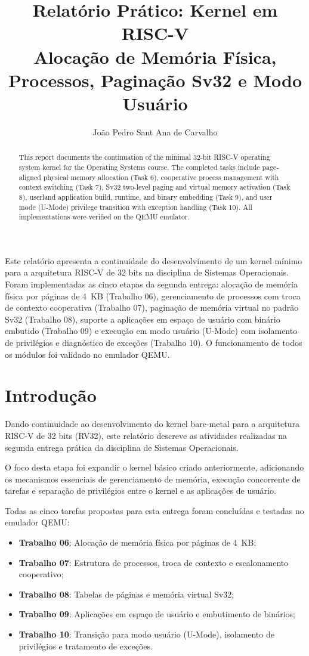 \documentclass[12pt]{article}
\title{Relatório Prático: Kernel em RISC-V\\
\large Alocação de Memória Física, Processos, Paginação Sv32 e Modo Usuário}
\author{João Pedro Sant Ana de Carvalho}
\begin{document}
\maketitle

\begin{abstract}
This report documents the continuation of the minimal 32-bit RISC-V operating system kernel for the Operating Systems course. The completed tasks include page-aligned physical memory allocation (Task 6), cooperative process management with context switching (Task 7), Sv32 two-level paging and virtual memory activation (Task 8), userland application build, runtime, and binary embedding (Task 9), and user mode (U-Mode) privilege transition with exception handling (Task 10). All implementations were verified on the QEMU emulator.
\end{abstract}

\begin{resumo}
Este relatório apresenta a continuidade do desenvolvimento de um kernel mínimo para a arquitetura RISC-V de 32 bits na disciplina de Sistemas Operacionais. Foram implementadas as cinco etapas da segunda entrega: alocação de memória física por páginas de 4~KB (Trabalho 06), gerenciamento de processos com troca de contexto cooperativa (Trabalho 07), paginação de memória virtual no padrão Sv32 (Trabalho 08), suporte a aplicações em espaço de usuário com binário embutido (Trabalho 09) e execução em modo usuário (U-Mode) com isolamento de privilégios e diagnóstico de exceções (Trabalho 10). O funcionamento de todos os módulos foi validado no emulador QEMU.
\end{resumo}

\section{Introdução}

Dando continuidade ao desenvolvimento do kernel bare-metal para a arquitetura RISC-V de 32 bits (RV32), este relatório descreve as atividades realizadas na segunda entrega prática da disciplina de Sistemas Operacionais.

O foco desta etapa foi expandir o kernel básico criado anteriormente, adicionando os mecanismos essenciais de gerenciamento de memória, execução concorrente de tarefas e separação de privilégios entre o kernel e as aplicações de usuário.

Todas as cinco tarefas propostas para esta entrega foram concluídas e testadas no emulador QEMU:
\begin{itemize}
    \item \textbf{Trabalho 06}: Alocação de memória física por páginas de 4~KB;
    \item \textbf{Trabalho 07}: Estrutura de processos, troca de contexto e escalonamento cooperativo;
    \item \textbf{Trabalho 08}: Tabelas de páginas e memória virtual Sv32;
    \item \textbf{Trabalho 09}: Aplicações em espaço de usuário e embutimento de binários;
    \item \textbf{Trabalho 10}: Transição para modo usuário (U-Mode), isolamento de privilégios e tratamento de exceções.
\end{itemize}
\end{document}
